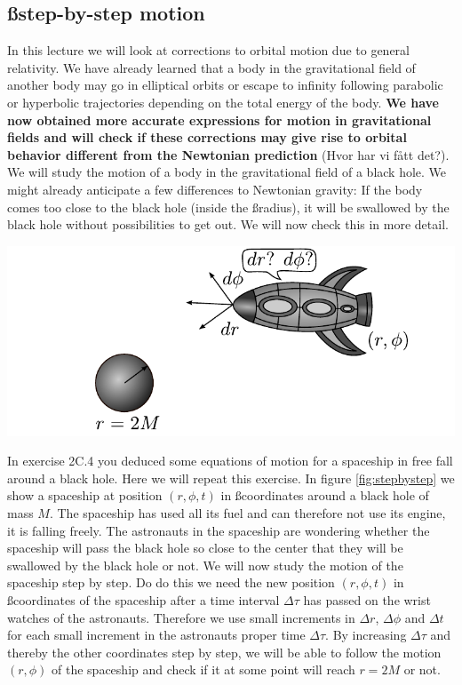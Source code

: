 {\begin{multicols}{2}

\section{\ss step-by-step motion}

In this lecture we will look at corrections to orbital motion due to general relativity. We have already learned that a body in the gravitational field of another body may go in elliptical orbits or escape to infinity following parabolic or hyperbolic trajectories depending on the total energy of the body. \textbf{We have now obtained more accurate expressions for motion in gravitational fields and will check if these corrections may give rise to orbital behavior different from the Newtonian prediction} (Hvor har vi fått det?). We will study the motion of a body in the gravitational field of a black hole. We might already anticipate a few differences to Newtonian gravity: If the body comes too close to the black hole (inside the \ss radius), it will be swallowed by the black hole without possibilities to get out. We will now check this in more detail.


\begin{Figure}
\centering
\includegraphics[width=\textwidth]{fig_17-1.pdf}
\end{Figure}

In exercise 2C.4 you deduced some equations of motion for a spaceship in free fall around a black hole. Here we will repeat this exercise. In figure \ref{fig:stepbystep} we show a spaceship at position $(r,\phi,t)$ in \ss coordinates around a black hole of mass $M$. The spaceship has used all its fuel and can therefore not use its engine, it is falling freely. The astronauts in the spaceship are wondering whether the spaceship will pass the black hole so close to the center that they will be swallowed by the black hole or not. We will now study the motion of the spaceship step by step. Do do this we need the new position $(r,\phi,t)$ in \ss coordinates of the spaceship after a time interval $\Delta\tau$ has passed on the wrist watches of the astronauts. Therefore we use small increments in $\Delta r$, $\Delta\phi$ and $\Delta t$ for each small increment in the astronauts proper time $\Delta\tau$. By increasing $\Delta\tau$ and thereby the other coordinates step by step, we will be able to follow the motion $(r,\phi)$ of the spaceship and check if it at some point will reach $r=2M$ or not.


\end{multicols}}
